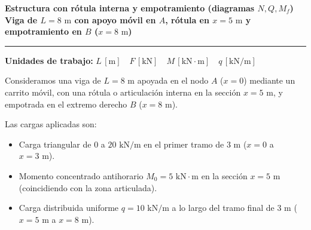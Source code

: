 \begin{tcolorbox}[colback=blue!3!white, colframe=blue!40!black, arc=3pt, boxrule=0.8pt, left=8pt, right=8pt, top=6pt, bottom=6pt]

    \centering

    {\Large\bfseries\color{blue!60!black} Estructura con rótula interna y empotramiento (diagramas $N, Q, M_f$)}\\[2pt]

    {\normalsize\bfseries Viga de $L = 8\text{ m}$ con apoyo móvil en $A$, rótula en $x=5\text{ m}$ y empotramiento en $B$ ($x=8\text{ m}$)}



    \vspace{4pt}\hrule\vspace{4pt}

    {\small\textbf{Unidades de trabajo:} $L\,[\text{m}] \quad F\,[\text{kN}] \quad M\,[\text{kN}\cdot\text{m}] \quad q\,[\text{kN/m}]$}

\end{tcolorbox}






Consideramos una viga de $L = 8\text{ m}$ apoyada en el nodo $A$ ($x=0$) mediante un carrito móvil, con una rótula o articulación interna en la sección $x = 5\text{ m}$, y empotrada en el extremo derecho $B$ ($x=8\text{ m}$).

Las cargas aplicadas son:

\begin{itemize}

    \item Carga triangular de $0$ a $20\text{ kN/m}$ en el primer tramo de $3\text{ m}$ ($x=0$ a $x=3\text{ m}$).

    \item Momento concentrado antihorario $M_0 = 5\text{ kN}\cdot\text{m}$ en la sección $x = 5\text{ m}$ (coincidiendo con la zona articulada).

    \item Carga distribuida uniforme $q = 10\text{ kN/m}$ a lo largo del tramo final de $3\text{ m}$ ($x=5\text{ m}$ a $x=8\text{ m}$).

\end{itemize}



